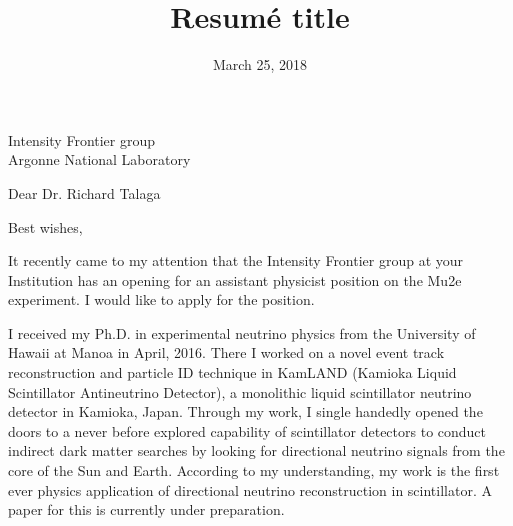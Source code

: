 \documentclass[12pt,letterpaper,sans]{moderncv}        %
\title{Resumé title}                               %
\begin{document}
{
	Intensity Frontier group\\
	Argonne National Laboratory\\
}
\date{March 25, 2018}
\opening{Dear Dr. Richard Talaga}
\closing{Best wishes,}
\makelettertitle

It recently came to my attention that the Intensity Frontier group at your
Institution has an opening for an assistant physicist position on the Mu2e
experiment. I would like to apply for the position.

I received my Ph.D. in experimental neutrino physics from the University of
Hawaii at Manoa in April, 2016. There I worked on a novel event track
reconstruction and particle ID technique in KamLAND (Kamioka Liquid
Scintillator Antineutrino Detector), a monolithic liquid scintillator neutrino
detector in Kamioka, Japan. Through my work, I single handedly opened the doors
to a never before explored capability of scintillator detectors to conduct
indirect dark matter searches by looking for directional neutrino signals from
the core of the Sun and Earth. According to my understanding, my work is the
first ever physics application of directional neutrino reconstruction in
scintillator. A paper for this is currently under preparation.

\end{document}
